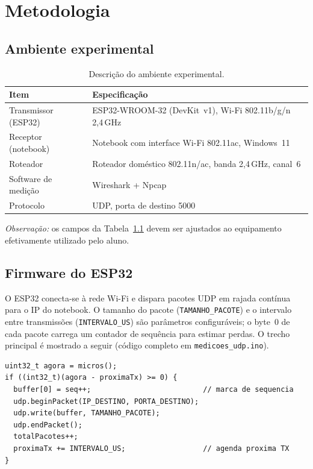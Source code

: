 \documentclass[
  12pt,
  a4paper,
  oneside,
  brazil,
  chapter=TITLE,
  section=TITLE,
]{abntex2}
\begin{document}
\chapter{Metodologia}

\section{Ambiente experimental}
\begin{table}[H]
  \centering
  \caption{Descrição do ambiente experimental.}
  \label{tab:ambiente}
  \begin{tabular}{ll}
    \toprule
    \textbf{Item} & \textbf{Especificação} \\
    \midrule
    Transmissor (ESP32) & ESP32-WROOM-32 (DevKit~v1), Wi-Fi 802.11b/g/n 2,4\,GHz \\
    Receptor (notebook) & Notebook com interface Wi-Fi 802.11ac, Windows~11 \\
    Roteador            & Roteador doméstico 802.11n/ac, banda 2,4\,GHz, canal~6 \\
    Software de medição & Wireshark + Npcap \\
    Protocolo           & UDP, porta de destino 5000 \\
    \bottomrule
  \end{tabular}
\end{table}

\noindent\textit{Observação:} os campos da Tabela~\ref{tab:ambiente} devem ser
ajustados ao equipamento efetivamente utilizado pelo aluno.

\section{Firmware do ESP32}
O ESP32 conecta-se à rede Wi-Fi e dispara pacotes UDP em rajada contínua para o
IP do notebook. O tamanho do pacote (\texttt{TAMANHO\_PACOTE}) e o intervalo
entre transmissões (\texttt{INTERVALO\_US}) são parâmetros configuráveis; o
byte~0 de cada pacote carrega um contador de sequência para estimar perdas. O
trecho principal é mostrado a seguir (código completo em
\texttt{medicoes\_udp.ino}).

\begin{lstlisting}[style=cpp,caption={Laço de transmissão UDP do ESP32.}]
uint32_t agora = micros();
if ((int32_t)(agora - proximaTx) >= 0) {
  buffer[0] = seq++;                          // marca de sequencia
  udp.beginPacket(IP_DESTINO, PORTA_DESTINO);
  udp.write(buffer, TAMANHO_PACOTE);
  udp.endPacket();
  totalPacotes++;
  proximaTx += INTERVALO_US;                  // agenda proxima TX
}
\end{lstlisting}
\end{document}
